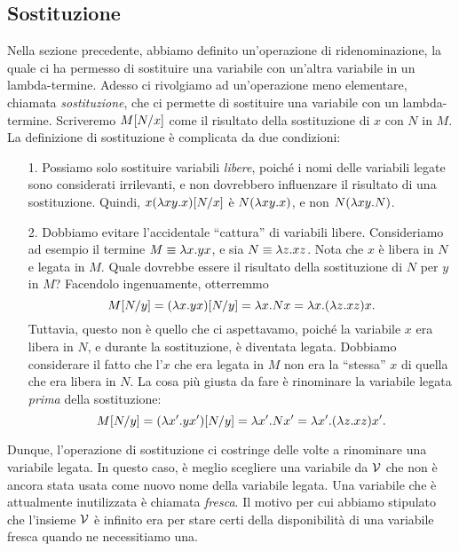 \documentclass{article}
\begin{document}
\subsection{Sostituzione}\label{ssec-sostituzione}

Nella sezione precedente, abbiamo definito un'operazione di 
ridenominazione, la quale ci ha permesso di sostituire una variabile 
con un'altra variabile in un lambda-termine. Adesso ci rivolgiamo ad 
un'operazione meno elementare, chiamata {\em sostituzione}, che ci 
permette di sostituire una variabile con un lambda-termine. Scriveremo
$M[N/x]$ come il risultato della sostituzione di $x$ con $N$ 
in $M$. La definizione di sostituzione \`e complicata da due condizioni:
\begin{enumerate}
\item[1.] Possiamo solo sostituire variabili {\em libere}, poich\'e i nomi
delle variabili legate sono considerati irrilevanti, e non
dovrebbero influenzare il risultato di una sostituzione. Quindi, $x(\lambda
    xy.x)[N/x]$ \`e $N(\lambda xy.x)$, e non $N(\lambda xy.N)$.
\item[2.] Dobbiamo evitare l'accidentale ``cattura'' di variabili
libere. Consideriamo ad esempio il termine $M\equiv\lambda x.yx$, e sia
  $N\equiv\lambda z.xz$. Nota che $x$ \`e libera in $N$ e legata in $M$.
Quale dovrebbe essere il risultato della sostituzione di $N$ per $y$ in $M$?
Facendolo ingenuamente, otterremmo
  \[ M[N/y]=(\lambda x.yx)[N/y]=
     \lambda x.Nx=\lambda x.(\lambda z.xz)x. 
  \]
  Tuttavia, questo non \`e quello che ci aspettavamo, poich\'e la variabile $x$
  era libera in $N$, e durante la sostituzione, \`e diventata legata. Dobbiamo
  considerare il fatto che l'$x$ che era legata in $M$ non era la 
  ``stessa'' $x$ di quella che era libera in $N$. La cosa pi\`u giusta da fare
\`e rinominare la variabile legata {\em prima} della sostituzione:
  \[ M[N/y]=(\lambda x'.yx')[N/y]=
     \lambda x'.Nx'=\lambda x'.(\lambda z.xz)x'. 
  \]
\end{enumerate}

Dunque, l'operazione di sostituzione ci costringe delle volte a rinominare
una variabile legata. In questo caso, \`e meglio scegliere una variabile da
${\cal V}$ che non \`e ancora stata usata come nuovo nome della variabile
legata. Una variabile che \`e attualmente inutilizzata \`e chiamata {\em fresca}.
Il motivo per cui abbiamo stipulato che l'insieme ${\cal V}$ \`e infinito era per
stare certi della disponibilit\`a di una variabile fresca quando ne necessitiamo una.
\end{document}
